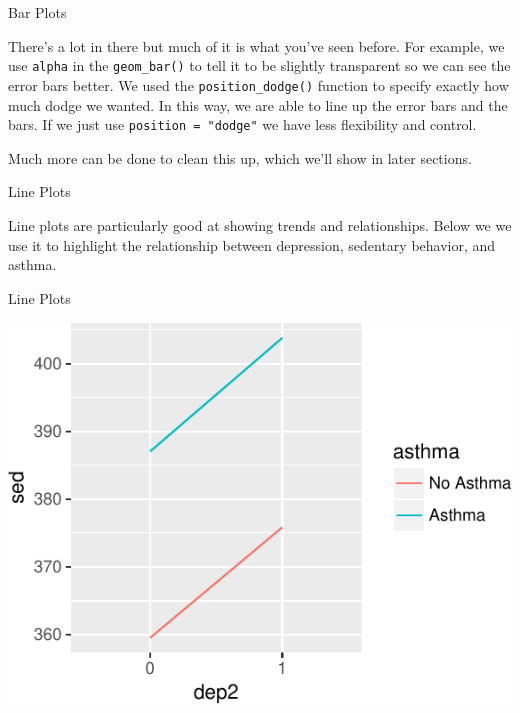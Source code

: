 \begin{frame}[fragile]{Bar Plots}

There's a lot in there but much of it is what you've seen before. For
example, we use \texttt{alpha} in the \texttt{geom\_bar()} to tell it to
be slightly transparent so we can see the error bars better. We used the
\texttt{position\_dodge()} function to specify exactly how much dodge we
wanted. In this way, we are able to line up the error bars and the bars.
If we just use \texttt{position\ =\ "dodge"} we have less flexibility
and control.

Much more can be done to clean this up, which we'll show in later
sections.

\end{frame}

\begin{frame}[fragile]{Line Plots}

Line plots are particularly good at showing trends and relationships.
Below we we use it to highlight the relationship between depression,
sedentary behavior, and asthma.

\begin{Shaded}
\begin{Highlighting}[]
\NormalTok{(}
                        \OperatorTok{+}
\StringTok{  }\NormalTok{(}\NormalTok{(}
\end{Highlighting}
\end{Shaded}

\end{frame}

\begin{frame}{Line Plots}

\includegraphics{09_AdvancedPlotting_files/figure-beamer/c8-1.pdf}

\end{frame}

